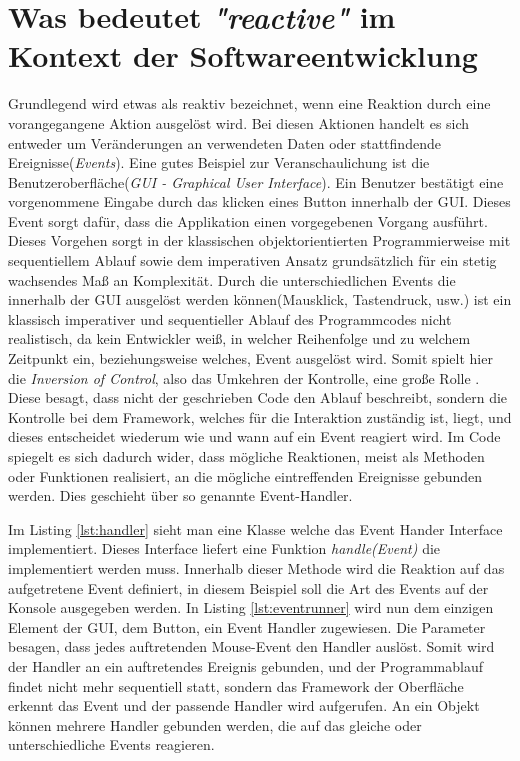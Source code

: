 \chapter{Was bedeutet \textit{"reactive"} im Kontext der Softwareentwicklung}\label{was_ist_reactive_programming}
Grundlegend wird etwas als reaktiv bezeichnet, wenn eine Reaktion durch eine vorangegangene Aktion ausgelöst wird. Bei diesen Aktionen handelt es sich entweder um Veränderungen an verwendeten Daten oder stattfindende Ereignisse(\textit{Events}). Eine gutes Beispiel zur Veranschaulichung ist die Benutzeroberfläche(\textit{GUI - Graphical User Interface}). Ein Benutzer bestätigt eine vorgenommene Eingabe durch das klicken eines Button innerhalb der GUI. Dieses Event sorgt dafür, dass die Applikation einen vorgegebenen Vorgang ausführt. Dieses Vorgehen sorgt in der klassischen objektorientierten Programmierweise mit sequentiellem Ablauf sowie dem imperativen Ansatz grundsätzlich für ein stetig wachsendes Maß an Komplexität. Durch die unterschiedlichen Events die innerhalb der GUI ausgelöst werden können(Mausklick, Tastendruck, usw.) ist ein klassisch imperativer und sequentieller Ablauf des Programmcodes nicht realistisch, da kein Entwickler weiß, in welcher Reihenfolge und zu welchem Zeitpunkt ein, beziehungsweise welches, Event ausgelöst wird. Somit spielt hier die \textit{Inversion of Control}, also das Umkehren der Kontrolle, eine große Rolle \cite{MartinFowler.2005}. Diese besagt, dass nicht der geschrieben Code den Ablauf beschreibt, sondern die Kontrolle bei dem Framework, welches für die Interaktion zuständig ist, liegt, und dieses entscheidet wiederum wie und wann auf ein Event reagiert wird. Im Code spiegelt es sich dadurch wider, dass mögliche Reaktionen, meist als Methoden oder Funktionen realisiert, an die mögliche eintreffenden Ereignisse gebunden werden. Dies geschieht über so genannte Event-Handler. 



Im Listing \ref{lst:handler} sieht man eine Klasse welche das Event Hander Interface implementiert. Dieses Interface liefert eine Funktion \textit{handle(Event)} die implementiert werden muss. Innerhalb dieser Methode wird die Reaktion auf das aufgetretene Event definiert, in diesem Beispiel soll die Art des Events auf der Konsole ausgegeben werden. In Listing \ref{lst:eventrunner} wird nun dem einzigen Element der GUI, dem Button, ein Event Handler zugewiesen. Die Parameter besagen, dass jedes auftretenden Mouse-Event den Handler auslöst. Somit wird der Handler an ein auftretendes Ereignis gebunden, und der Programmablauf findet nicht mehr sequentiell statt, sondern das Framework der Oberfläche erkennt das Event und der passende Handler wird aufgerufen. An ein Objekt können mehrere Handler gebunden werden, die auf das gleiche oder unterschiedliche Events reagieren.

